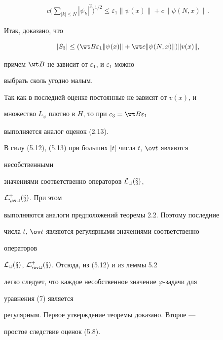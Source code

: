 \begin{pf}
\begin{multline*}
c\bigg(\sum_{|k|\le N}|\psi_k|^2\bigg)^{1/2}\le 


\varepsilon_1\|\psi(x)\|+c\|\psi(N,x)\|. 


\end{multline*} 


Итак, доказано, что 


$$ 


|S_3|\le(\wt B\varepsilon_1\|\psi(x)\|+\wt c\|\psi(N,x)\|) 


\|v(x)\|, 


$$ 


причем $\wt B$ не зависит от $\varepsilon_1$, и $\varepsilon_1$ можно 


выбрать сколь угодно малым.  


Так как в последней оценке постоянные не зависят от $v(x)$, и 


множество $L_\varphi$ плотно в $H$, то при $c_3=\wt B\varepsilon_1$ 


выполняется аналог оценок (2.13). 


В силу (5.12), (5.13) при больших $|t|$ числа $t$, $\ov t$ являются 


несобственными 


значениями соответственно операторов $\cal L_t(x)$, 


$\cal L^+_{\ov t}(x)$. При этом  


выполняются аналоги предположений теоремы 2.2. Поэтому последние  


числа $t$, $\ov t$ являются регулярными значениями соответственно 


операторов 


$\cal L_t(x)$, $\cal L^+_{\ov t}(x)$. Отсюда, из (5.12) и из леммы 5.2 


легко следует, что каждое несобственное значение $\varphi$-задачи для 


уравнения (7) является 


регулярным. Первое утверждение теоремы доказано. Второе --- 


простое следствие оценок (5.8). 


\end{pf} 


 


